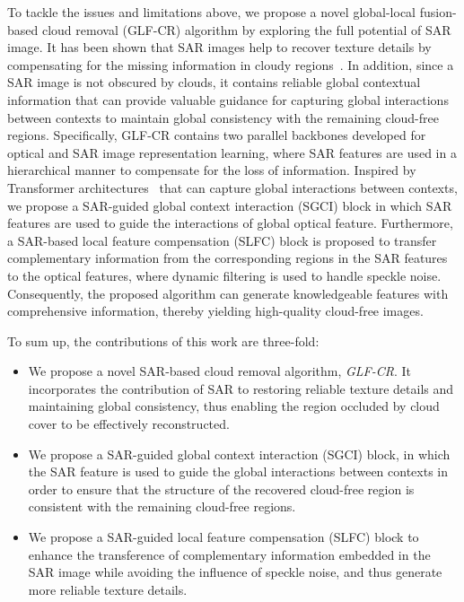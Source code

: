 \documentclass[a4paper,fleqn]{cas-dc}
\begin{document}
To tackle the issues and limitations above, we propose a novel global-local fusion-based cloud removal (GLF-CR) algorithm by exploring the full potential of SAR image. It has been shown that SAR images help to recover texture details by compensating for the missing information in cloudy regions~\citep{meraner2020cloud}. In addition, since a SAR image is not obscured by clouds, it contains reliable global contextual information that can provide valuable guidance for capturing global interactions between contexts to maintain global consistency with the remaining cloud-free regions.
Specifically, GLF-CR contains two parallel backbones developed for optical and SAR image representation learning, where SAR features are used in a hierarchical manner to compensate for the loss of information. Inspired by Transformer architectures~\citep{vaswani2017attention} that can capture global interactions between contexts, we propose a SAR-guided global context interaction (SGCI) block in which SAR features are used to guide the interactions of global optical feature. Furthermore, a SAR-based local feature compensation (SLFC) block is proposed to transfer complementary information from the corresponding regions in the SAR features to the optical features, where dynamic filtering is used to handle speckle noise. Consequently, the proposed algorithm can generate knowledgeable features with comprehensive information, thereby yielding high-quality cloud-free images.

To sum up, the contributions of this work are three-fold:
\begin{itemize} 
	\item We propose a novel SAR-based cloud removal algorithm, {\it GLF-CR}. It incorporates the contribution of SAR to restoring reliable texture details and maintaining global consistency, thus enabling the region occluded by cloud cover to be effectively reconstructed.
	\item We propose a SAR-guided global context interaction (SGCI) block, in which the SAR feature is used to guide the global interactions between contexts in order to ensure that the structure of the recovered cloud-free region is consistent with the remaining cloud-free regions.
	\item We propose a SAR-guided local feature compensation (SLFC) block to enhance the transference of complementary information embedded in the SAR image while avoiding the influence of speckle noise, and thus generate more reliable texture details.
\end{itemize}  
\end{document}

